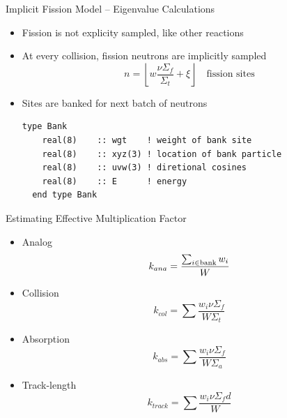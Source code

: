 \documentclass[serif]{beamer}
\begin{document}

\begin{frame}[fragile]{Implicit Fission Model -- Eigenvalue Calculations}

\begin{itemize}

  \item Fission is not explicity sampled, like other reactions\vfill
  \item At every collision, fission neutrons are implicitly sampled\vfill
  \begin{equation*}
     n = \left \lfloor w \frac{\nu\Sigma_f}{\Sigma_t} + \xi \right
     \rfloor \quad \text{fission sites}
  \end{equation*} \vfill
  \item Sites are banked for next batch of neutrons\vfill
  \begin{lstlisting}[language={[90]Fortran},frame=single,backgroundcolor=\color{gray!20},keywordstyle=\color{darkblue}]
  type Bank
    real(8)    :: wgt    ! weight of bank site
    real(8)    :: xyz(3) ! location of bank particle
    real(8)    :: uvw(3) ! diretional cosines
    real(8)    :: E      ! energy
  end type Bank
  \end{lstlisting} 
\end{itemize}

\end{frame}


\begin{frame}{Estimating Effective Multiplication Factor}

  \begin{itemize}

    \item Analog
\[
    k_{ana} = \frac{\sum_{i\in\rm{bank}}w_i}{W}
\]
    \item Collision
\[
    k_{col} = \sum\frac{w_i\nu\Sigma_{f}}{W\Sigma_{t}}
\]
    \item Absorption
\[
    k_{abs} = \sum\frac{w_i\nu\Sigma_{f}}{W\Sigma_{a}}
\]
    \item Track-length
\[
    k_{track} = \sum\frac{w_i\nu\Sigma_{f}d}{W}
\]
  \end{itemize}

\end{frame}

\end{document}
